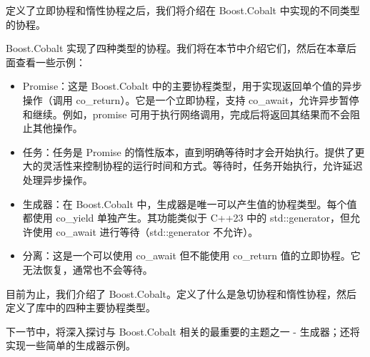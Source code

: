 定义了立即协程和惰性协程之后，我们将介绍在 Boost.Cobalt 中实现的不同类型的协程。


Boost.Cobalt 实现了四种类型的协程。我们将在本节中介绍它们，然后在本章后面查看一些示例：

\begin{itemize}
\item
Promise：这是 Boost.Cobalt 中的主要协程类型，用于实现返回单个值的异步操作（调用 co\_return）。它是一个立即协程，支持 co\_await，允许异步暂停和继续。例如，promise 可用于执行网络调用，完成后将返回其结果而不会阻止其他操作。

\item
任务：任务是 Promise 的惰性版本，直到明确等待时才会开始执行。提供了更大的灵活性来控制协程的运行时间和方式。等待时，任务开始执行，允许延迟处理异步操作。

\item
生成器：在 Boost.Cobalt 中，生成器是唯一可以产生值的协程类型。每个值都使用 co\_yield 单独产生。其功能类似于 C++23 中的 std::generator，但允许使用 co\_await 进行等待（std::generator 不允许）。

\item
分离：这是一个可以使用 co\_await 但不能使用 co\_return 值的立即协程。它无法恢复，通常也不会等待。
\end{itemize}

目前为止，我们介绍了 Boost.Cobalt。定义了什么是急切协程和惰性协程，然后定义了库中的四种主要协程类型。

下一节中，将深入探讨与 Boost.Cobalt 相关的最重要的主题之一 - 生成器；还将实现一些简单的生成器示例。














































